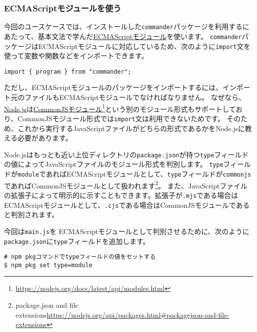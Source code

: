 \hypertarget{esmodule}{%
\subsubsection{ECMAScriptモジュールを使う}\label{esmodule}}

今回のユースケースでは、インストールした\texttt{commander}パッケージを利用するにあたって、基本文法で学んだ\hyperlink{module}{ECMAScriptモジュール}を使います。
\texttt{commander}パッケージはECMAScriptモジュールに対応しているため、次のように\texttt{import}文を使って変数や関数などをインポートできます。

\begin{lstlisting}
import { program } from "commander";
\end{lstlisting}

ただし、ECMAScriptモジュールのパッケージをインポートするには、インポート元のファイルもECMAScriptモジュールでなければなりません。
なぜなら、\href{https://nodejs.org/ja/}{Node.js}は\href{https://nodejs.org/docs/latest/api/modules.html}{CommonJSモジュール}\footnote{\url{https://nodejs.org/docs/latest/api/modules.html}}という別のモジュール形式もサポートしており、CommonJSモジュール形式では\texttt{import}文は利用できないためです。
そのため、これから実行するJavaScriptファイルがどちらの形式であるかをNode.jsに教える必要があります。

Node.jsはもっとも近い上位ディレクトリの\texttt{package.json}が持つ\texttt{type}フィールドの値によってJavaScriptファイルのモジュール形式を判別します。
\texttt{type}フィールドが\texttt{module}であればECMAScriptモジュールとして、\texttt{type}フィールドが\texttt{commonjs}であればCommonJSモジュールとして扱われます\footnote{package.json and file extensions\newline\url{https://nodejs.org/api/packages.html\#packagejson-and-file-extensions}}。
また、JavaScriptファイルの拡張子によって明示的に示すこともできます。拡張子が\texttt{.mjs}である場合はECMAScriptモジュールとして、\texttt{.cjs}である場合はCommonJSモジュールであると判別されます。

今回は\texttt{main.js}を ECMAScriptモジュールとして判別させるために、次のように \texttt{package.json}に\texttt{type}フィールドを追加します。

\begin{lstlisting}
# npm pkgコマンドでtypeフィールドの値をセットする
$ npm pkg set type=module
\end{lstlisting}




